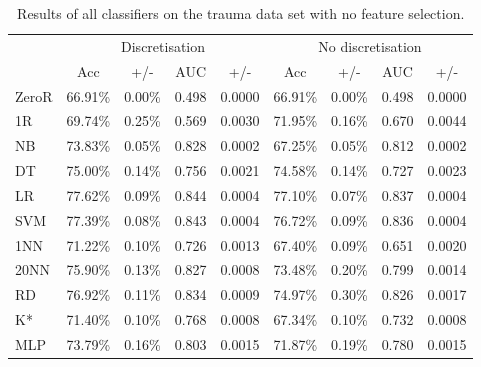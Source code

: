 \begin{table}[htbp]
\caption{Results of all classifiers on the trauma data set with no feature selection.}
\begin{tabular}{|l|cccc|cccc|}
\hline
 & \multicolumn{ 4}{c|}{Discretisation} & \multicolumn{ 4}{c|}{No discretisation} \\
 & Acc & +/- & \multicolumn{1}{c}{AUC} & \multicolumn{1}{c|}{+/-} & Acc & +/- & \multicolumn{1}{c}{AUC} & \multicolumn{1}{c|}{+/-} \\ \hline
  ZeroR & 66.91\% & 0.00\% & 0.498 & 0.0000 & 66.91\% & 0.00\% & 0.498 & 0.0000 \\
  1R & 69.74\% & 0.25\% & 0.569 & 0.0030 & 71.95\% & 0.16\% & 0.670 & 0.0044 \\
  NB & 73.83\% & 0.05\% & 0.828 & 0.0002 & 67.25\% & 0.05\% & 0.812 & 0.0002 \\
  DT & 75.00\% & 0.14\% & 0.756 & 0.0021 & 74.58\% & 0.14\% & 0.727 & 0.0023 \\
  LR & 77.62\% & 0.09\% & 0.844 & 0.0004 & 77.10\% & 0.07\% & 0.837 & 0.0004 \\
  SVM & 77.39\% & 0.08\% & 0.843 & 0.0004 & 76.72\% & 0.09\% & 0.836 & 0.0004 \\ 
  1NN & 71.22\% & 0.10\% & 0.726 & 0.0013 & 67.40\% & 0.09\% & 0.651 & 0.0020 \\ 
  20NN & 75.90\% & 0.13\% & 0.827 & 0.0008 & 73.48\% & 0.20\% & 0.799 & 0.0014 \\
  RD & 76.92\% & 0.11\% & 0.834 & 0.0009 & 74.97\% & 0.30\% & 0.826 & 0.0017 \\
  K* & 71.40\% & 0.10\% & 0.768 & 0.0008 & 67.34\% & 0.10\% & 0.732 & 0.0008 \\
  MLP & 73.79\% & 0.16\% & 0.803 & 0.0015 & 71.87\% & 0.19\% & 0.780 & 0.0015 \\ \hline
\end{tabular}
\label{}
\end{table}
